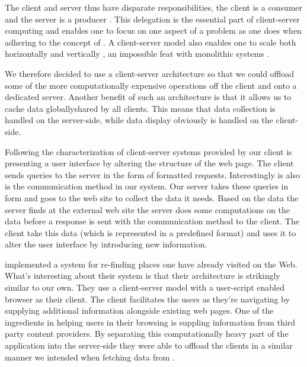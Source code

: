The client and server thus have disparate responsibilities, the client is a
consumer and the server is a producer \citep[]{lewandowski98}.
This delegation is the
essential part of client-server computing and enables one to focus on one
aspect of a problem as one does when adhering to the concept of
 \citep[]{dijkstra82}.
A client-server model also enables one to scale both horizontally and
vertically%
,
an impossible feat with monolithic systems \citep[]{lewandowski98}.

We therefore decided to use a client-server architecture so that we could
offload some of the more computationally expensive operations off the client
and onto a dedicated server. Another benefit of such an architecture is that
it allows us to cache data globally\dash{}shared by all clients. This means
that data collection is handled on the server-side, while data display
obviously is handled on the client-side.

Following the characterization of client-server systems provided by
\citeauthor{sinha92} our client is presenting a user interface
by altering the structure of the \urort{} web page. The client sends queries
to the server in the form of %
formatted requests. Interestingly  is also is the communication
method in our system. Our server takes these queries in  form
and goes to the \urort{} web site to collect the data it needs. Based on the
data the server finds at the external \urort{} web site the server does some
computations on the data before a response is sent
with the  communication method to the client. The client take this
data (which is represented in a predefined format) and uses it to alter the
user interface by introducing new information.

\citet[--888]{nishimoto06} implemented a system for re-finding places
one have already visited on the Web. What's interesting about their system is
that their architecture is strikingly similar to our own. They use a
client-server model with a user-script enabled browser as their client. The
client facilitates the users as they're navigating by supplying additional
information alongside existing web pages. One of the ingredients in helping
users in their browsing is suppling information from third party content
providers. By separating this computationally heavy part of the application
into the server-side they were able to offload the clients in a similar
manner we intended when fetching data from \urort{}.

